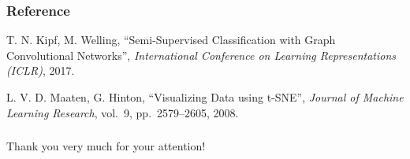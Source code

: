 \documentclass{beamer}
\begin{document}
\begin{frame}
\frametitle{Reference}
\begin{justify}
\begin{thebibliography}{9}
   
   T. N. Kipf, M. Welling,
   ``Semi-Supervised Classification with Graph Convolutional Networks'',
   \textit{International Conference on Learning Representations (ICLR)}, 2017.

   L. V. D. Maaten, G. Hinton,
   ``Visualizing Data using t-SNE'',
   \textit{Journal of Machine Learning Research}, vol.~9, pp.~2579--2605, 2008.

\end{thebibliography}
\end{justify}
\end{frame}

\begin{frame}
\frametitle{}
\begin{center}
Thank you very much for your attention!
\end{center}
\end{frame}
\end{document}
